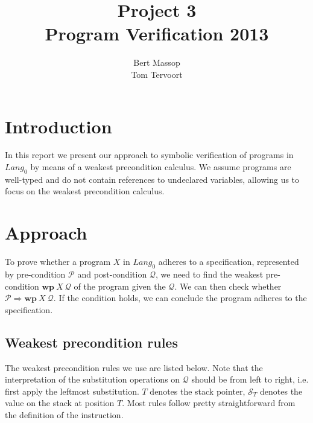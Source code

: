 \documentclass[a4paper]{article}
\title{Project 3\\\large\sc Program Verification 2013}
\author{Bert Massop\\Tom Tervoort}
\newcommand{\Q}{\mathcal{Q}}
\renewcommand{\P}{\mathcal{P}}
\renewcommand{\wp}{\mathbf{wp}}
\newcommand{\stack}[1]{\mathcal{S}_{#1}}
\begin{document}
\maketitle

\tableofcontents\clearpage

\section{Introduction}
In this report we present our approach to symbolic verification of programs in $\mathit{Lang}_0$ by means of a weakest precondition calculus. We assume programs are well-typed and do not contain references to undeclared variables, allowing us to focus on the weakest precondition calculus.

\section{Approach}
To prove whether a program $X$ in $\mathit{Lang}_0$ adheres to a specification, represented by pre-condition $\P$ and post-condition $\Q$, we need to find the weakest pre-condition $\wp\ X\ \Q$ of the program given the $\Q$. We can then check whether $\P \Rightarrow \wp\ X\ \Q$. If the condition holds, we can conclude the program adheres to the specification.

\subsection{Weakest precondition rules}
The weakest precondition rules we use are listed below. Note that the interpretation of the substitution operations on $\Q$ should be from left to right, i.e. first apply the leftmost substitution. $T$ denotes the stack pointer, $\stack{T}$ denotes the value on the stack at position $T$. Most rules follow pretty straightforward from the definition of the instruction.
\end{document}
